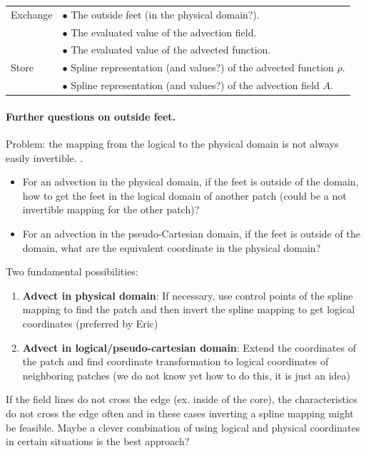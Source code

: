 \documentclass[presentation.tex]{subfiles}
\begin{document}
\begin{center}
\begin{tabular}{ |l|l| } 
 \hline
 Exchange 	&  $\bullet$ The outside feet (in the physical domain?). \\
 			&  $\bullet$ The evaluated value of the advection field. \\
 			&  $\bullet$ The evaluated value of the advected function. \\

 \hline
 Store 	& $\bullet$ Spline representation (and values?) of the advected function $\rho$. \\
 		& $\bullet$ Spline representation (and values?) of the advection field $A$. \\
 \hline
\end{tabular}
\end{center}

\paragraph{Further questions on outside feet.}
Problem: the mapping from the logical to the physical domain is not always easily invertible. 
.
\begin{itemize}
	\item For an advection in the physical domain, if the feet is outside of the domain, how to get the feet in the logical domain of another patch (could be a not invertible mapping for the other patch)?
	\item For an advection in the pseudo-Cartesian domain, if the feet is outside of the domain, what are the equivalent coordinate in the physical domain? 
\end{itemize}

Two fundamental possibilities:
\begin{enumerate}
	\item \textbf{Advect in physical domain}: If necessary, use control points of the spline mapping
			to find the patch and then invert the spline mapping to get logical coordinates
			(preferred by Eric)
	\item \textbf{Advect in logical/pseudo-cartesian domain}: Extend the coordinates of the patch
			and find coordinate transformation to logical coordinates of neighboring patches
			(we do not know yet how to do this, it is just an idea)
\end{enumerate}
If the field lines do not cross the edge (ex. inside of the core), the characteristics do not cross the edge often and 
in these cases inverting a spline mapping might be feasible. Maybe a clever combination of using logical and 
physical coordinates in certain situations is the best approach?
\end{document}
